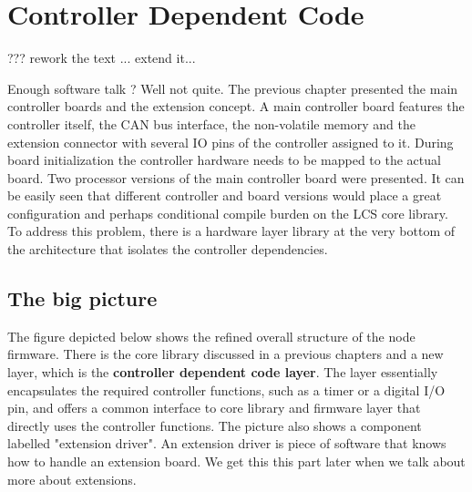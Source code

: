
\chapter{Controller Dependent Code}

??? rework the text ... extend it...

Enough software talk ? Well not quite. The previous chapter presented the main controller boards and the extension concept. A main controller board features the controller itself, the CAN bus interface, the non-volatile memory and the extension connector with several IO pins of the controller assigned to it. During board initialization the controller hardware needs to be mapped to the actual board. Two processor versions of the main controller board were presented. It can be easily seen that different controller and board versions would place a great configuration and perhaps conditional compile burden on the LCS core library. To address this problem, there is a hardware layer library at the very bottom of the architecture that isolates the controller dependencies.

\section{The big picture}

The figure depicted below shows the refined overall structure of the node firmware. There is the core library discussed in a previous chapters and a new layer, which is the \textbf{controller dependent code layer}. The layer essentially encapsulates the required controller functions, such as a timer or a digital I/O pin, and offers a common interface to core library and firmware layer that directly uses the controller functions. The picture also shows a component labelled "extension driver". An extension driver is piece of software that knows how to handle an extension board. We get this this part later when we talk about more about extensions.

